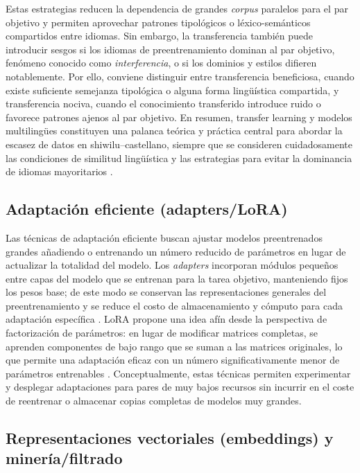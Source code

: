 \documentclass[12pt,a4paper,oneside]{book}
\begin{document}
Estas estrategias reducen la dependencia de grandes \emph{corpus} paralelos para el par objetivo y permiten aprovechar patrones tipológicos o léxico-semánticos compartidos entre idiomas. Sin embargo, la transferencia también puede introducir sesgos si los idiomas de preentrenamiento dominan al par objetivo, fenómeno conocido como \emph{interferencia}, o si los dominios y estilos difieren notablemente. Por ello, conviene distinguir entre transferencia beneficiosa, cuando existe suficiente semejanza tipológica o alguna forma lingüística compartida, y transferencia nociva, cuando el conocimiento transferido introduce ruido o favorece patrones ajenos al par objetivo. En resumen, transfer learning y modelos multilingües constituyen una palanca teórica y práctica central para abordar la escasez de datos en shiwilu--castellano, siempre que se consideren cuidadosamente las condiciones de similitud lingüística y las estrategias para evitar la dominancia de idiomas mayoritarios \parencite{zoph2016}.

\subsection{Adaptación eficiente (adapters/LoRA)}\label{adaptaciuxf3n-eficiente-adapterslora}

Las técnicas de adaptación eficiente buscan ajustar modelos preentrenados grandes añadiendo o entrenando un número reducido de parámetros en lugar de actualizar la totalidad del modelo. Los \emph{adapters} incorporan módulos pequeños entre capas del modelo que se entrenan para la tarea objetivo, manteniendo fijos los pesos base; de este modo se conservan las representaciones generales del preentrenamiento y se reduce el costo de almacenamiento y cómputo para cada adaptación específica \parencite{houlsby2019}. LoRA propone una idea afín desde la perspectiva de factorización de parámetros: en lugar de modificar matrices completas, se aprenden componentes de bajo rango que se suman a las matrices originales, lo que permite una adaptación eficaz con un número significativamente menor de parámetros entrenables \parencite{hu2022lora}. Conceptualmente, estas técnicas permiten experimentar y desplegar adaptaciones para pares de muy bajos recursos sin incurrir en el coste de reentrenar o almacenar copias completas de modelos muy grandes.

\subsection{Representaciones vectoriales (embeddings) y minería/filtrado}\label{representaciones-vectoriales-embeddings-y-mineruxedafiltrado}
\end{document}
